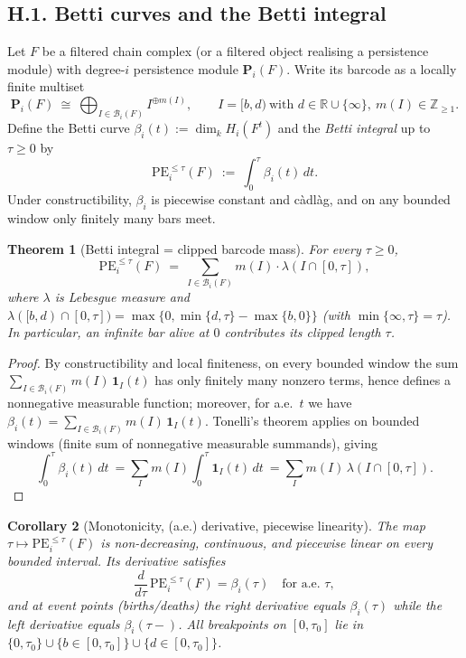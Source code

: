 \documentclass[11pt]{article}
\DeclareRobustCommand{\hyp}{\nobreakdash-}
\numberwithin{equation}{section}
\newtheorem{theorem}{Theorem}[section]
\newtheorem{corollary}[theorem]{Corollary}
\theoremstyle{definition}
\begin{document}
\subsection*{H.1. Betti curves and the Betti integral}
Let \(F\) be a filtered chain complex (or a filtered object realising a persistence module) with degree-\(i\) persistence module \(\mathbf{P}_i(F)\).
Write its barcode as a locally finite multiset
\[
\mathbf{P}_i(F)\ \cong\ \bigoplus_{I\in \mathcal{B}_i(F)} I^{\oplus m(I)},\qquad I=[b,d)\ \text{with } d\in\mathbb{R}\cup\{\infty\},\ m(I)\in\mathbb{Z}_{\ge 1}.
\]
Define the Betti curve \(\beta_i(t):=\dim_k H_i(F^t)\) and the \emph{Betti integral} up to \(\tau\ge 0\) by
\[
\mathrm{PE}_i^{\le \tau}(F)\ :=\ \int_{0}^{\tau} \beta_i(t)\,dt.
\]
Under constructibility, \(\beta_i\) is piecewise constant and càdlàg, and on any bounded window only finitely many bars meet.

\begin{theorem}[Betti integral = clipped barcode mass]\label{H:thm:betti-integral}
For every \(\tau\ge 0\),
\[
\mathrm{PE}_i^{\le \tau}(F)\ =\ \sum_{I\in \mathcal{B}_i(F)} m(I)\cdot \lambda\!\left(I\cap[0,\tau]\right),
\]
where \(\lambda\) is Lebesgue measure and
\(\lambda([b,d)\cap[0,\tau])=\max\{0,\min\{d,\tau\}-\max\{b,0\}\}\) (with \(\min\{\infty,\tau\}=\tau\)). In particular, an infinite bar alive at \(0\) contributes its clipped length \(\tau\).
\end{theorem}

\begin{proof}
By constructibility and local finiteness, on every bounded window the sum \(\sum_{I\in\mathcal{B}_i(F)} m(I)\,\mathbf{1}_I(t)\) has only finitely many nonzero terms, hence defines a nonnegative measurable function; moreover, for a.e.\ \(t\) we have
\(\beta_i(t)=\sum_{I\in\mathcal{B}_i(F)} m(I)\,\mathbf{1}_I(t)\).
Tonelli’s theorem applies on bounded windows (finite sum of nonnegative measurable summands), giving
\[
\int_{0}^{\tau}\!\beta_i(t)\,dt\ =\sum_{I} m(I)\int_{0}^{\tau}\!\mathbf{1}_{I}(t)\,dt\ =\sum_{I} m(I)\,\lambda\!\left(I\cap[0,\tau]\right).
\]
\end{proof}

\begin{corollary}[Monotonicity, (a.e.) derivative, piecewise linearity]\label{H:cor:pl}
The map \(\tau\mapsto \mathrm{PE}_i^{\le \tau}(F)\) is non\hyp decreasing, continuous, and piecewise linear on every bounded interval. Its derivative satisfies
\[
\frac{d}{d\tau}\,\mathrm{PE}_i^{\le \tau}(F)=\beta_i(\tau)\quad\text{for a.e.\ }\tau,
\]
and at event points (births/deaths) the right derivative equals \(\beta_i(\tau)\) while the left derivative equals \(\beta_i(\tau-)\). All breakpoints on \([0,\tau_0]\) lie in \(\{0,\tau_0\}\cup\{b\in[0,\tau_0]\}\cup\{d\in[0,\tau_0]\}\).
\end{corollary}
\end{document}
